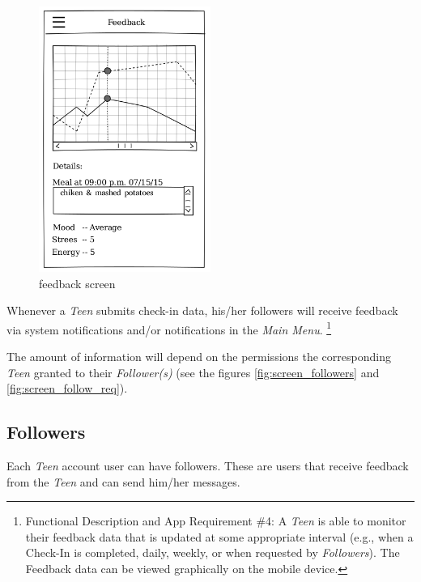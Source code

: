 \documentclass{article}
\begin{document}
    \begin{figure}[h]
        \centering
        \includegraphics[width=0.5\textwidth,height=\textheight,keepaspectratio]{feedback.png}
        \caption{feedback screen}
        \label{fig:screen_feedback}
    \end{figure}
    
    Whenever a \emph{Teen} submits check-in data, his/her followers will receive feedback via system notifications and/or notifications in the \emph{Main Menu}. 
    \footnote{Functional Description and App Requirement \#4: A \emph{Teen} is able to monitor their feedback data that is updated at some appropriate interval (e.g., when a Check-In is completed, daily, weekly, or when requested by \emph{Followers}). The Feedback data can be viewed graphically on the mobile device.}

    The amount of information will depend on the permissions the corresponding \emph{Teen} granted to their \emph{Follower(s)} (see the figures \ref{fig:screen_followers} and \ref{fig:screen_follow_req}).

\newpage

    \subsection{Followers}

    Each \emph{Teen} account user can have followers. These are users that receive feedback from the \emph{Teen} and can send him/her messages.
\end{document}
